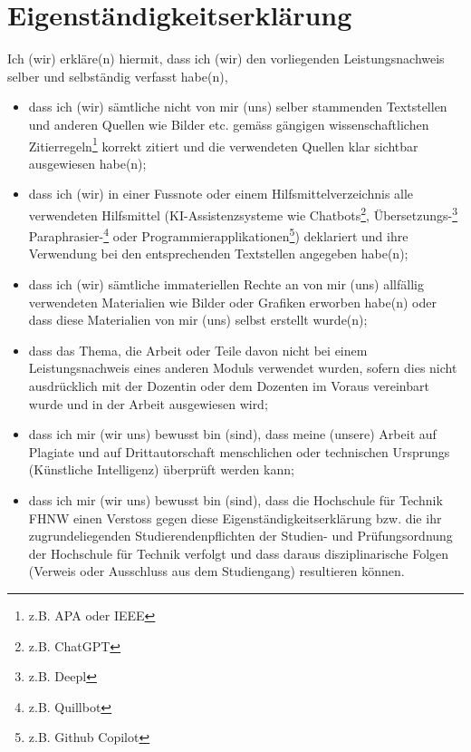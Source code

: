 \section*{Eigenständigkeitserklärung}


Ich (wir) erkläre(n) hiermit, dass ich (wir) den vorliegenden Leistungsnachweis selber und selbständig verfasst habe(n),
\begin{itemize} 
\item dass ich (wir) sämtliche nicht von mir (uns) selber stammenden Textstellen und anderen Quellen wie Bilder etc. gemäss gängigen wissenschaftlichen Zitierregeln\footnote{z.B. APA oder IEEE} korrekt zitiert und die verwendeten Quellen klar sichtbar ausgewiesen habe(n); 
\item dass ich (wir) in einer Fussnote oder einem Hilfsmittelverzeichnis alle verwendeten Hilfsmittel (KI-Assistenzsysteme wie Chatbots\footnote{z.B. ChatGPT}, Übersetzungs-\footnote{z.B. Deepl} Paraphrasier-\footnote{z.B. Quillbot} oder Programmierapplikationen\footnote{z.B. Github Copilot}) deklariert und ihre Verwendung bei den entsprechenden Textstellen angegeben habe(n);
\item dass ich (wir) sämtliche immateriellen Rechte an von mir (uns) allfällig verwendeten Materialien wie Bilder oder Grafiken erworben habe(n) oder dass diese Materialien von mir (uns) selbst erstellt wurde(n);
\item dass das Thema, die Arbeit oder Teile davon nicht bei einem Leistungsnachweis eines anderen Moduls verwendet wurden, sofern dies nicht ausdrücklich mit der Dozentin oder dem Dozenten im Voraus vereinbart wurde und in der Arbeit ausgewiesen wird; 
\item dass ich mir (wir uns) bewusst bin (sind), dass meine (unsere) Arbeit auf Plagiate und auf Drittautorschaft menschlichen oder technischen Ursprungs (Künstliche Intelligenz) überprüft werden kann;
\item dass ich mir (wir uns) bewusst bin (sind), dass die Hochschule für Technik FHNW einen Verstoss gegen diese Eigenständigkeitserklärung bzw. die ihr zugrundeliegenden Studierendenpflichten der Studien- und Prüfungsordnung der Hochschule für Technik verfolgt und dass daraus disziplinarische Folgen (Verweis oder Ausschluss aus dem Studiengang) resultieren können.
\end{itemize}

